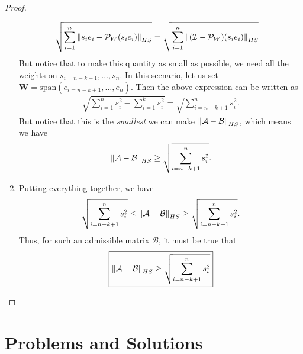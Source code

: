 \documentclass{book}
\theoremstyle{definition}
\newcommand{\W}{\mathbf{W}}
\newcommand{\A}{\mathcal{A}}
\newcommand{\B}{\mathcal{B}}
\newcommand{\xpan}{\text{span}}
\newcommand{\id}{\mathcal{I}}
\begin{document}
\begin{proof}
\begin{enumerate}
	\begin{align*}
	\sqrt{\sum^n_{i=1}\norm{s_i e_i - \mathcal{P}_{W}(s_ie_i)}_{HS}}
	&=\sqrt{\sum^n_{i=1}\norm{(\id - \mathcal{P}_W)(s_i e_i)}_{HS}} 
	\end{align*}
	But notice that to make this quantity as small as possible, we need all the weights on $s_{i=n-k+1},\dots,s_n$. In this scenario, let us set $\W = \xpan(e_{i=n-k+1},\dots,e_n)$. Then the above expression can be written as
	\begin{align*}
	\sqrt{\sum^n_{i=1}s_i^2 - \sum^{k}_{i=1}s_i^2} = \sqrt{\sum_{i=n-k+1}^{n}s_i^2}.
	\end{align*}
	But notice that this is the \textit{smallest} we can make $\norm{\A - \B}_{HS}$, which means we have
	\begin{align*}
	\norm{\A - \B}_{HS} \geq \sqrt{\sum_{i=n-k+1}^{n}s_i^2}.
	\end{align*}
	
	
	\item Putting everything together, we have
	\begin{align*}
	\sqrt{\sum_{i=n-k+1}^{n}s_i^2} \leq \norm{\A - \B}_{HS} \geq \sqrt{\sum_{i=n-k+1}^{n}s_i^2}.
	\end{align*}
	Thus, for such an admissible matrix $\B$, it must be true that
	\begin{align*}
	\boxed{\norm{\A - \B}_{HS} \geq \sqrt{\sum_{i=n-k+1}^{n}s_i^2}}
	\end{align*}
	\end{enumerate}
\end{proof}






































\newpage
\chapter{Problems and Solutions}
\end{document}
